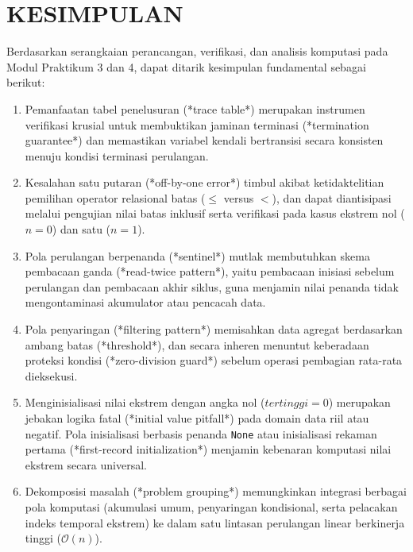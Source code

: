 \documentclass[12pt,a4paper]{article}
\begin{document}
\section{KESIMPULAN}
Berdasarkan serangkaian perancangan, verifikasi, dan analisis komputasi pada Modul Praktikum 3 dan 4, dapat ditarik kesimpulan fundamental sebagai berikut:
\begin{enumerate}
    \item Pemanfaatan tabel penelusuran (*trace table*) merupakan instrumen verifikasi krusial untuk membuktikan jaminan terminasi (*termination guarantee*) dan memastikan variabel kendali bertransisi secara konsisten menuju kondisi terminasi perulangan.
    \item Kesalahan satu putaran (*off-by-one error*) timbul akibat ketidaktelitian pemilihan operator relasional batas ($\le$ versus $<$), dan dapat diantisipasi melalui pengujian nilai batas inklusif serta verifikasi pada kasus ekstrem nol ($n = 0$) dan satu ($n = 1$).
    \item Pola perulangan berpenanda (*sentinel*) mutlak membutuhkan skema pembacaan ganda (*read-twice pattern*), yaitu pembacaan inisiasi sebelum perulangan dan pembacaan akhir siklus, guna menjamin nilai penanda tidak mengontaminasi akumulator atau pencacah data.
    \item Pola penyaringan (*filtering pattern*) memisahkan data agregat berdasarkan ambang batas (*threshold*), dan secara inheren menuntut keberadaan proteksi kondisi (*zero-division guard*) sebelum operasi pembagian rata-rata dieksekusi.
    \item Menginisialisasi nilai ekstrem dengan angka nol ($tertinggi = 0$) merupakan jebakan logika fatal (*initial value pitfall*) pada domain data riil atau negatif. Pola inisialisasi berbasis penanda \texttt{None} atau inisialisasi rekaman pertama (*first-record initialization*) menjamin kebenaran komputasi nilai ekstrem secara universal.
    \item Dekomposisi masalah (*problem grouping*) memungkinkan integrasi berbagai pola komputasi (akumulasi umum, penyaringan kondisional, serta pelacakan indeks temporal ekstrem) ke dalam satu lintasan perulangan linear berkinerja tinggi ($\mathcal{O}(n)$).
\end{enumerate}

\end{document}
